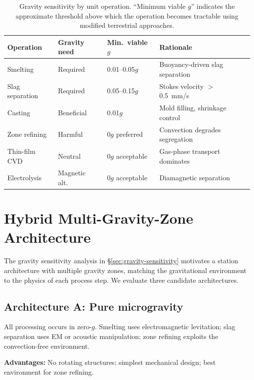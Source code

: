\documentclass[preprint,12pt]{elsarticle}
\begin{document}
\begin{table}[ht]
\centering
\caption{Gravity sensitivity by unit operation. ``Minimum viable $g$'' indicates the approximate threshold above which the operation becomes tractable using modified terrestrial approaches.}
\label{tab:gravity-sensitivity}
\begin{tabular}{lllp{4.5cm}}
\toprule
\textbf{Operation} & \textbf{Gravity need} & \textbf{Min.\ viable $g$} & \textbf{Rationale} \\
\midrule
Smelting & Required & 0.01--0.05$g$ & Buoyancy-driven slag separation \\
Slag separation & Required & 0.05--0.15$g$ & Stokes velocity $>$ 0.5~mm/s \\
Casting & Beneficial & 0.01$g$ & Mold filling, shrinkage control \\
Zone refining & Harmful & 0$g$ preferred & Convection degrades segregation \\
Thin-film CVD & Neutral & 0$g$ acceptable & Gas-phase transport dominates \\
Electrolysis & Magnetic alt.\ & 0$g$ acceptable & Diamagnetic separation \cite{akay2025} \\
\bottomrule
\end{tabular}
\end{table}

\section{Hybrid Multi-Gravity-Zone Architecture}
\label{sec:architecture}

The gravity sensitivity analysis in \S\ref{sec:gravity-sensitivity} motivates a station architecture with multiple gravity zones, matching the gravitational environment to the physics of each process step. We evaluate three candidate architectures.

\subsection{Architecture A: Pure microgravity}

All processing occurs in zero-$g$. Smelting uses electromagnetic levitation; slag separation uses EM or acoustic manipulation; zone refining exploits the convection-free environment.

\textbf{Advantages:} No rotating structures; simplest mechanical design; best environment for zone refining.
\end{document}
